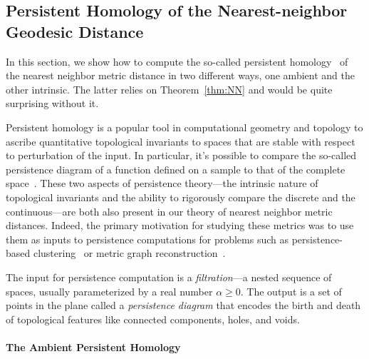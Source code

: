 \subsection{Persistent Homology of the Nearest-neighbor Geodesic Distance}
  \label{sec:persistence}

% 
  In this section, we show how to compute the so-called persistent homology~\cite{edelsbrunner02topological} of the nearest neighbor metric distance in two different ways, one ambient and the other intrinsic.
  The latter relies on Theorem~\ref{thm:NN} and would be quite surprising without it.

  Persistent homology is a popular tool in computational geometry and topology to ascribe quantitative topological invariants to spaces that are stable with respect to perturbation of the input.
  In particular, it's possible to compare the so-called persistence diagram of a function defined on a sample to that of the complete space~\cite{chazal08towards}.
  These two aspects of persistence theory---the intrinsic nature of topological invariants and the ability to rigorously compare the discrete and the continuous---are both also present in our theory of nearest neighbor metric distances.
  Indeed, the primary motivation for studying these metrics was to use them as inputs to persistence computations for problems such as persistence-based clustering~\cite{chazal13persistence} or metric graph reconstruction~\cite{aanjaneya12metric}.

  The input for persistence computation is a \emph{filtration}---a nested sequence of spaces, usually parameterized by a real number $\alpha\ge 0$.
  The output is a set of points in the plane called a \emph{persistence diagram} that encodes the birth and death of topological features like connected components, holes, and voids.

  \paragraph*{The Ambient Persistent Homology}

